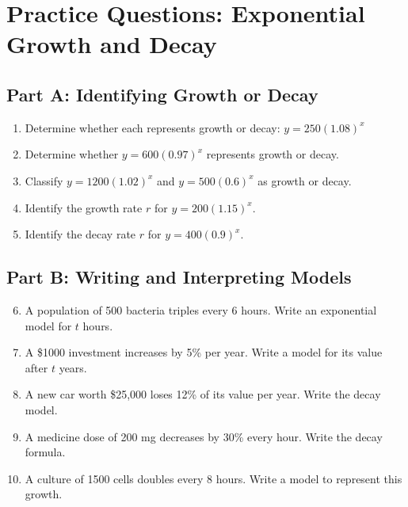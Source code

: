 \documentclass[12pt]{article}
\begin{document}
\newpage


\section*{Practice Questions: Exponential Growth and Decay}

\subsection*{Part A: Identifying Growth or Decay}
\begin{enumerate}
  \item Determine whether each represents growth or decay:  
  \(y = 250(1.08)^x\)
  \item Determine whether \(y = 600(0.97)^x\) represents growth or decay.
  \item Classify \(y = 1200(1.02)^x\) and \(y = 500(0.6)^x\) as growth or decay.
  \item Identify the growth rate \(r\) for \(y = 200(1.15)^x.\)
  \item Identify the decay rate \(r\) for \(y = 400(0.9)^x.\)
\end{enumerate}

\subsection*{Part B: Writing and Interpreting Models}
\begin{enumerate}
  \setcounter{enumi}{5}
  \item A population of 500 bacteria triples every 6 hours. Write an exponential model for \(t\) hours.
  \item A \$1000 investment increases by 5\% per year. Write a model for its value after \(t\) years.
  \item A new car worth \$25,000 loses 12\% of its value per year. Write the decay model.
  \item A medicine dose of 200 mg decreases by 30\% every hour. Write the decay formula.
  \item A culture of 1500 cells doubles every 8 hours. Write a model to represent this growth.
\end{enumerate}
\end{document}
